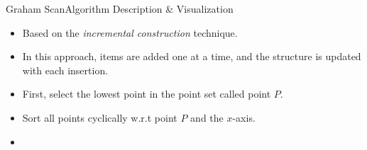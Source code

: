 \documentclass{beamer}
\begin{document}
 \begin{frame}{Graham Scan}{Algorithm Description \& Visualization}
    \begin{itemize}
        \item Based on the \textit{incremental construction} technique.
        \item In this approach, items are added one at a time, and the structure is updated with each insertion. 
        \item First, select the lowest point in the point set called point $P$.
        \item Sort all points cyclically w.r.t point $P$ and the $x$-axis.
        \item 
    \end{itemize}
 \end{frame}
  
%     
      
  
    
    
    
      
\end{document}
